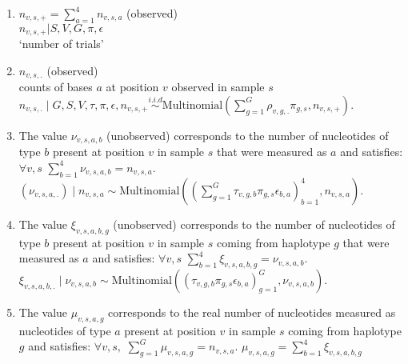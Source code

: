 \documentclass{article}
\begin{document}
\begin{enumerate}
\begin{enumerate}
    \item $n_{v,s,+}=\sum_{a=1}^4 n_{v,s,a}$ (observed)\\
    $n_{v,s,+}|S,V, G,\pi,\epsilon$\\  
    `number of trials'


    
    \item$n_{v,s,.}$  (observed) \\counts of bases $a$ at position $v$ observed in sample $s$ \\
    $n_{v,s,.}\mid G,S,V,\tau,\pi,\epsilon,n_{v,s,+}\overset{i.i.d}{\sim} \mathrm{Multinomial}\left(\sum_{g=1}^G \rho_{v,g,.}\pi_{g,s},n_{v,s,+}\right)$. 
    \item The value $\nu_{v,s,a,b}$ (unobserved) corresponds to the number of nucleotides of type $b$ present at position $v$ in sample $s$ that were measured as $a$ and satisfies: $\forall v,s$ $\sum_{b=1}^4\nu_{v,s,a,b}=n_{v,s,a}$. 
    $(\nu_{v,s,a,.}) \mid n_{v,s,a} \sim \mathrm{Multinomial}\left(\left(\sum_{g=1}^G \tau_{v,g,b} \pi_{g,s}\epsilon_{b,a}\right)_{b=1}^4,n_{v,s,a}\right).$
    \item The value $\xi_{v,s,a,b,g}$ (unobserved) corresponds to the number of nucleotides of type $b$ present at position $v$ in sample $s$ coming from haplotype $g$ that were measured as $a$ and satisfies: $\forall v,s$ $\sum_{b=1}^4\xi_{v,s,a,b,g}=\nu_{v,s,a,b}$. 
    $\xi_{v,s,a,b,.} \mid \nu_{v,s,a,b} \sim \mathrm{Multinomial}\left(\left(\tau_{v,g,b} \pi_{g,s}\epsilon_{b,a}\right)_{g=1}^G,\nu_{v,s,a,b}\right).$
    
    \item The value $\mu_{v,s,a,g}$ corresponds to the real number of nucleotides  measured as nucleotides  of type $a$ present at position $v$ in sample $s$ coming from haplotype $g$ and satisfies: $\forall v,s,$  $\sum_{g=1}^G\mu_{v,s,a,g}=n_{v,s,a}$. 
    $\mu_{v,s,a,g}= \sum_{b=1}^4\xi_{v,s,a,b,g}$

\end{enumerate}
\end{enumerate}
\end{document}
